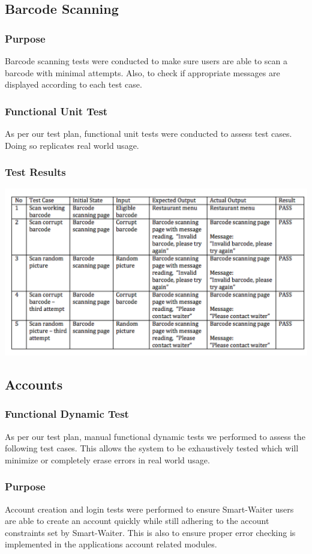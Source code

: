 \documentclass[12pt, titlepage]{article}
\begin{document}
\subsection{Barcode Scanning}

\subsubsection{Purpose}
Barcode scanning tests were conducted to make sure users are able to scan a barcode with minimal attempts. Also, to check if appropriate messages are displayed according to each test case.

\subsubsection{Functional Unit Test}
As per our test plan, functional unit tests were  conducted to assess test cases. Doing so replicates real world usage.

\subsubsection{Test Results}
\includegraphics[width=1.2\textwidth]{barcodeTable.png}

\subsection{Accounts}
\subsubsection{Functional Dynamic Test}
As per our test plan, manual functional dynamic tests we performed to assess the following test cases. This allows the system to be exhaustively tested which will minimize or completely erase errors in real world usage.
\subsubsection{Purpose}
Account creation and login tests were performed to ensure Smart-Waiter users are able to create an account quickly while still adhering to the account constraints set by Smart-Waiter. This is also to ensure proper error checking is implemented in the applications account related modules.
\end{document}
